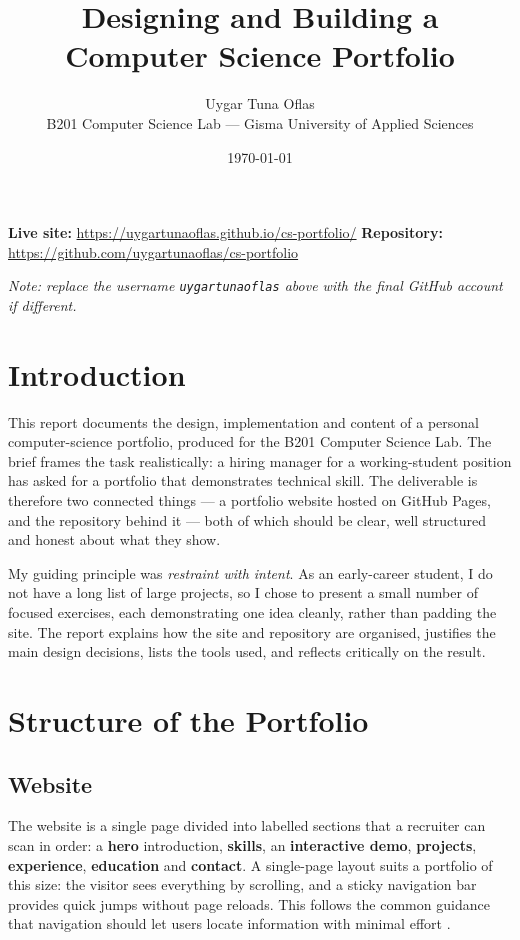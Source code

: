 \documentclass[11pt,a4paper]{article}
\title{\vspace{-1.2cm}\textbf{Designing and Building a Computer Science Portfolio}}
\author{Uygar Tuna Oflas \\ \small B201 Computer Science Lab — Gisma University of Applied Sciences}
\date{\small\today}
\begin{document}
\maketitle
\vspace{-0.6cm}

\begin{center}\small
\textbf{Live site:} \url{https://uygartunaoflas.github.io/cs-portfolio/} \quad\textbar\quad
\textbf{Repository:} \url{https://github.com/uygartunaoflas/cs-portfolio}
\end{center}
\vspace{0.2cm}
\noindent\textit{Note: replace the username \texttt{uygartunaoflas} above with the final GitHub account if different.}

\section{Introduction}
This report documents the design, implementation and content of a personal
computer-science portfolio, produced for the B201 Computer Science Lab. The brief
frames the task realistically: a hiring manager for a working-student position has
asked for a portfolio that demonstrates technical skill. The deliverable is therefore
two connected things --- a portfolio website hosted on GitHub Pages, and the
repository behind it --- both of which should be clear, well structured and honest
about what they show.

My guiding principle was \emph{restraint with intent}. As an early-career student, I
do not have a long list of large projects, so I chose to present a small number of
focused exercises, each demonstrating one idea cleanly, rather than padding the site.
The report explains how the site and repository are organised, justifies the main
design decisions, lists the tools used, and reflects critically on the result.

\section{Structure of the Portfolio}

\subsection{Website}
The website is a single page divided into labelled sections that a recruiter can scan
in order: a \textbf{hero} introduction, \textbf{skills}, an \textbf{interactive demo},
\textbf{projects}, \textbf{experience}, \textbf{education} and \textbf{contact}. A
single-page layout suits a portfolio of this size: the visitor sees everything by
scrolling, and a sticky navigation bar provides quick jumps without page reloads. This
follows the common guidance that navigation should let users locate information with
minimal effort \citep{nielsen2020}.
\end{document}
